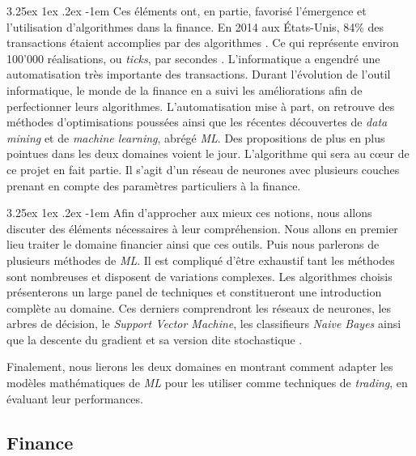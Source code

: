 \documentclass[a4paper, 11pt]{article}
\makeatletter
\renewcommand\paragraph{\@startsection{paragraph}{5}{\z@}%
  {3.25ex \@plus1ex \@minus.2ex}%
  {-1em}%
  {\normalfont\normalsize\bfseries}}
\makeatother
\begin{document}
\paragraph{}
Ces éléments ont, en partie, favorisé l'émergence et l'utilisation d'algorithmes dans la finance. 
En 2014 aux États-Unis, 84\% des transactions étaient accomplies par des algorithmes \cite{real_investors}. 
Ce qui représente environ 100'000 réalisations, ou \textit{ticks}, par secondes \cite{real_investors}. L'informatique a engendré une automatisation très importante des transactions.
Durant l'évolution de l'outil informatique, le monde de la finance en a suivi les améliorations afin de perfectionner 
leurs algorithmes. L'automatisation mise à part, on retrouve des méthodes d'optimisations poussées ainsi que les récentes découvertes 
de \textit{data mining} et de \textit{machine learning}, abrégé \textit{ML}. 
Des propositions de plus en plus pointues dans les deux domaines voient le jour. 
L'algorithme qui sera au cœur de ce projet en fait partie. 
Il s'agit d'un réseau de neurones avec plusieurs couches prenant en compte des paramètres particuliers à la finance.

\paragraph{}Afin d'approcher aux mieux ces notions, nous allons discuter des éléments nécessaires à leur compréhension.
Nous allons en premier lieu traiter le domaine financier ainsi que ces outils. Puis nous parlerons de 
plusieurs méthodes de \textit{ML}. Il est compliqué d'être exhaustif tant les méthodes sont nombreuses et disposent de variations complexes. Les algorithmes choisis présenterons un large panel de techniques et constitueront une introduction complète au domaine. Ces derniers comprendront les réseaux de neurones, les arbres de décision, le \textit{Support Vector Machine}\cite{wikipedia_svm}, les classifieurs \textit{Naive Bayes} ainsi que la descente du gradient \cite{wikipedia_descente_du_gradient} et sa version dite stochastique \cite{descente_du_gradient_stochastique}.


Finalement, nous lierons les deux domaines en montrant comment adapter les modèles mathématiques de \textit{ML} pour les utiliser comme techniques de \textit{trading}, en évaluant leur performances.


\subsection{Finance}
\end{document}
